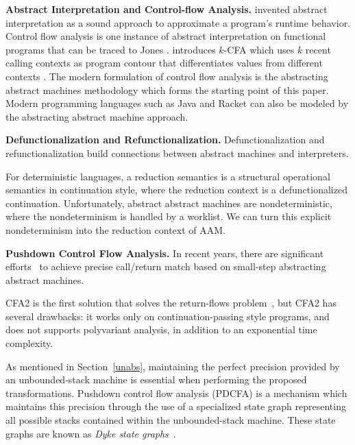 \documentclass[acmsmall,review,anonymous]{acmart}\settopmatter{printfolios=true,printccs=false,printacmref=false}
\begin{document}
\textbf{Abstract Interpretation and Control-flow Analysis.}
\citeauthor{cousot1977abstract} invented abstract interpretation as a sound approach
to approximate a program's runtime behavior\cite{cousot1977abstract}.
Control flow analysis is one instance of abstract interpretation on functional programs
that can be traced to Jones \cite{jones1981flow}.
\citeauthor{Shivers:1988:CFA:53990.54007} introduces $k$-CFA which uses $k$ recent calling contexts as program contour that differentiates values from different contexts \cite{Shivers:1988:CFA:53990.54007, Shivers:1991:SSC:115865.115884}.
The modern formulation of control flow analysis is the abstracting abstract machines
methodology \cite{van2012systematic, van2010abstracting} which forms the starting point of this paper.
Modern programming languages such as Java\cite{might2010resolving} and Racket \cite{Tobin-Hochstadt:2012:HSE:2384616.2384655}
can also be modeled by the abstracting abstract machine approach.

\textbf{Defunctionalization and Refunctionalization.}
Defunctionalization and refunctionalization build connections between abstract
machines and interpreters.

For deterministic languages, a reduction semantics is a structural operational
semantics in continuation style, where the reduction context is a
defunctionalized continuation.
Unfortunately, abstract abstract machines are nondeterministic, where
the nondeterminism is handled by a worklist.
We can turn this explicit nondeterminism into the reduction context of
AAM.

\textbf{Pushdown Control Flow Analysis.}
In recent years, there are significant efforts~\cite{vardoulakis2010cfa2, earl2012introspective,
gilray2016pushdown, johnson2015abstracting} to achieve precise call/return
match based on small-step abstracting abstract machines.

CFA2 is the first solution that solves the return-flows problem~\cite{vardoulakis2010cfa2},
but CFA2 has several drawbacks: it works only on continuation-passing style programs,
and does not supports polyvariant analysis, in addition to an exponential time
complexity.

As mentioned in Section~\ref{unabs}, maintaining the perfect precision provided by an unbounded-stack machine is essential when performing the proposed transformations. Pushdown control flow analysis (PDCFA) is a mechanism which maintains this precision through the use of a specialized state graph representing all possible stacks contained within the unbounded-stack machine. These state graphs are known as \emph{Dyke state graphs}~\cite{gilray2016pushdown}.
\end{document}
